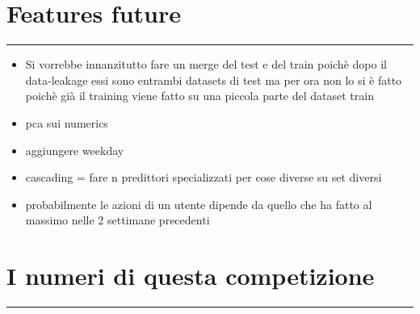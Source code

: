 \documentclass[11pt]{article}
\providecommand{\tightlist}{%
      \setlength{\itemsep}{0pt}\setlength{\parskip}{0pt}}
\begin{document}
    \section{Features future}\label{features-future}

\begin{center}\rule{0.5\linewidth}{\linethickness}\end{center}

\begin{itemize}
\tightlist
\item
  Si vorrebbe innanzitutto fare un merge del test e del train poichè
  dopo il data-leakage essi sono entrambi datasets di test ma per ora
  non lo si è fatto poichè già il training viene fatto su una piccola
  parte del dataset train
\item
  pca sui numerics
\item
  aggiungere weekday
\item
  cascading = fare n predittori specializzati per cose diverse su set
  diversi
\item
  probabilmente le azioni di un utente dipende da quello che ha fatto al
  massimo nelle 2 settimane precedenti
\end{itemize}

    \section{I numeri di questa
competizione}\label{i-numeri-di-questa-competizione}

\begin{center}\rule{0.5\linewidth}{\linethickness}\end{center}
\end{document}
